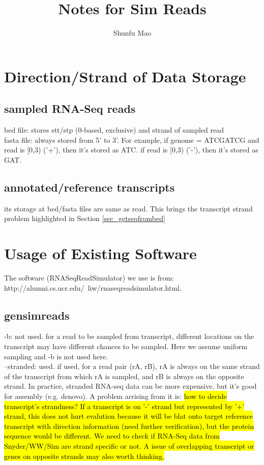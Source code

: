 \documentclass{article}
\title{Notes for Sim Reads}
\author{Shunfu Mao}
\begin{document}
\maketitle

\section{Direction/Strand of Data Storage}

\subsection{sampled RNA-Seq reads}
bed file: stores stt/stp (0-based, exclusive) and strand of sampled read\\

fasta file: always stored from 5' to 3'. For example, if genome = ATCGATCG and read is [0,3) ('+'), then it's stored as ATC. if read is [0,3) ('-'), then it's stored as GAT.

\subsection{annotated/reference transcripts}
its storage at bed/fasta files are same as read. This brings the transcript strand problem highlighted in Section \ref{sec_getseqfrombed}

\section{Usage of Existing Software}

The software (RNASeqReadSimulator) we use is from:\\ http://alumni.cs.ucr.edu/~liw/rnaseqreadsimulator.html.

\subsection{gensimreads}

-b: not used. for a read to be sampled from transcript, different locations on the transcript may have different chances to be sampled. Here we assume uniform sampling and -b is not used here.\\

--stranded: used. if used, for a read pair (rA, rB), rA is always on the same strand of the transcript from which rA is sampled, and rB is always on the opposite strand. In practice, stranded RNA-seq data can be more expensive, but it's good for assembly (e.g. denovo). A problem arrising from it is: \hl{how to decide transcript's strandness? If a transcript is on '-' strand but represented by '+' strand, this does not hurt evalution because it will be blat onto target reference transcript with direction information (need further verification), but the protein sequence would be different. We need to check if RNA-Seq data from Snyder/WW/Sim are strand specific or not. A issue of overlapping transcript or genes on opposite strands may also worth thinking.}\\
\end{document}
